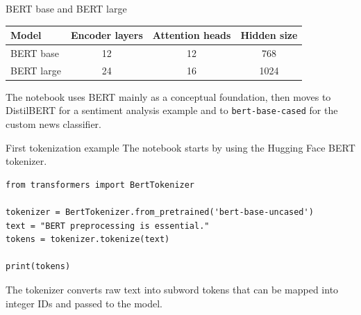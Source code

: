 \documentclass[aspectratio=169]{beamer}
\begin{document}
\begin{frame}{BERT base and BERT large}
\begin{center}
\begin{tabular}{lccc}
\toprule
\textbf{Model} & \textbf{Encoder layers} & \textbf{Attention heads} & \textbf{Hidden size} \\
\midrule
BERT base & 12 & 12 & 768 \\
BERT large & 24 & 16 & 1024 \\
\bottomrule
\end{tabular}
\end{center}

\vspace{0.4cm}

The notebook uses BERT mainly as a conceptual foundation, then moves to DistilBERT for a sentiment analysis example and to \texttt{bert-base-cased} for the custom news classifier.
\end{frame}

\begin{frame}[fragile]{First tokenization example}
The notebook starts by using the Hugging Face BERT tokenizer.

\begin{lstlisting}[style=pythonstyle]
from transformers import BertTokenizer

tokenizer = BertTokenizer.from_pretrained('bert-base-uncased')
text = "BERT preprocessing is essential."
tokens = tokenizer.tokenize(text)

print(tokens)
\end{lstlisting}

\vspace{0.2cm}

The tokenizer converts raw text into subword tokens that can be mapped into integer IDs and passed to the model.
\end{frame}
\end{document}
